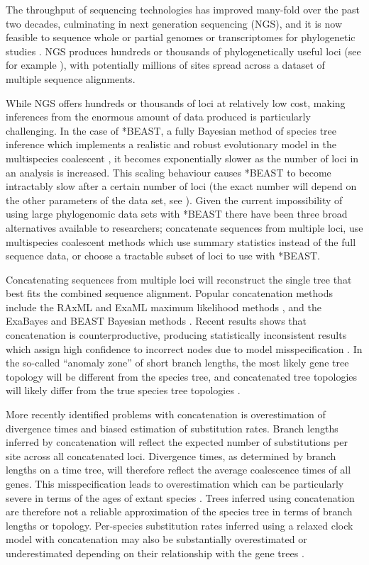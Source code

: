 \documentclass[12pt]{article}
\begin{document}
The throughput of sequencing technologies has improved many-fold over the past
two decades, culminating in next generation sequencing (NGS), and it is now
feasible to sequence whole or partial genomes or transcriptomes for phylogenetic
studies \citep{annurev-ecolsys-110512-135822}. NGS produces hundreds or
thousands of phylogenetically useful loci (see for example \cite{Blom056085}),
with potentially millions of sites spread across a dataset of multiple
sequence alignments.

While NGS offers hundreds or thousands of loci at relatively low cost, making
inferences from the enormous amount of data produced is particularly
challenging. In the case of *BEAST, a fully Bayesian method of species tree
inference which implements a realistic and robust evolutionary model in the
multispecies coalescent \citep{Degnan2009332}, it becomes exponentially slower
as the number of loci in an analysis is increased. This scaling behaviour causes
*BEAST to become intractably slow after a certain number of loci (the exact
number will depend on the other parameters of the data set, see
\cite{Ogilvie01052016}). Given the current impossibility of using large
phylogenomic data sets with *BEAST there have been three broad alternatives available
to researchers; concatenate sequences from multiple loci, use multispecies
coalescent methods which use summary statistics instead of the full sequence
data, or choose a tractable subset of loci to use with *BEAST.

Concatenating sequences from multiple loci will reconstruct the single tree that
best fits the combined sequence alignment. Popular concatenation methods include
the RAxML and ExaML maximum likelihood methods \citep{Stamatakis01052014,
Kozlov01082015}, and the ExaBayes and BEAST Bayesian methods
\citep{Aberer01102014, Drummond2007}. Recent results shows that concatenation
is counterproductive, producing statistically inconsistent results which assign
high confidence to incorrect nodes due to model misspecification
\citep{NYAS:NYAS12747}. In the so-called ``anomaly zone'' of short branch
lengths, the most likely gene tree topology will be different from the species
tree, and concatenated tree topologies will likely differ from the true species
tree topologies \citep{journal.pgen.0020068, Kubatko01022007}.

More recently identified problems with concatenation is overestimation of
divergence times and biased estimation of substitution rates. Branch lengths
inferred by concatenation will reflect the expected number of substitutions per
site across all concatenated loci. Divergence times, as determined by branch
lengths on a time tree, will therefore reflect the average coalescence times of
all genes. This misspecification leads to overestimation which can be
particularly severe in terms of the ages of extant species
\citep{Ogilvie01052016}. Trees inferred using concatenation are therefore not a
reliable approximation of the species tree in terms of branch lengths or
topology. Per-species substitution rates inferred using a relaxed clock model
with concatenation may also be substantially overestimated or underestimated
depending on their relationship with the gene trees \citep{Mendes28022016}.
\end{document}
